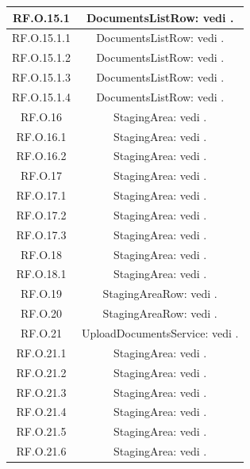 \documentclass[10pt, a4paper]{article}
\begin{document}
\begin{xltabular}{\textwidth}{c|c}
\hline
RF.O.15.1 & DocumentsListRow: vedi .\\ 
\hline
RF.O.15.1.1 & DocumentsListRow: vedi .\\ 
\hline
RF.O.15.1.2  &  DocumentsListRow: vedi .\\  
\hline
RF.O.15.1.3 &  DocumentsListRow: vedi .\\   
\hline
RF.O.15.1.4 &  DocumentsListRow: vedi . \\
\hline
RF.O.16 & StagingArea: vedi . \\ 
\hline
RF.O.16.1 & StagingArea: vedi . \\ 
\hline
RF.O.16.2 & StagingArea: vedi . \\  
\hline
RF.O.17 & StagingArea: vedi . \\  
\hline
RF.O.17.1 & StagingArea: vedi . \\ 
\hline
RF.O.17.2 & StagingArea: vedi . \\ 
\hline
RF.O.17.3 & StagingArea: vedi . \\ 
\hline
RF.O.18 &  StagingArea: vedi . \\ 
\hline
RF.O.18.1 & StagingArea: vedi . \\ 
\hline
RF.O.19 & StagingAreaRow: vedi . \\ 
\hline
RF.O.20 & StagingAreaRow: vedi . \\   
\hline
RF.O.21 & UploadDocumentsService: vedi .\\
\hline
RF.O.21.1 & StagingArea: vedi .\\ 
\hline
RF.O.21.2 & StagingArea: vedi .\\ 
\hline
RF.O.21.3 &  StagingArea: vedi .\\  
\hline
RF.O.21.4 &  StagingArea: vedi .\\ 
\hline
RF.O.21.5 & StagingArea: vedi .\\  
\hline
RF.O.21.6 & StagingArea: vedi .\\ 

\end{xltabular}
\end{document}
